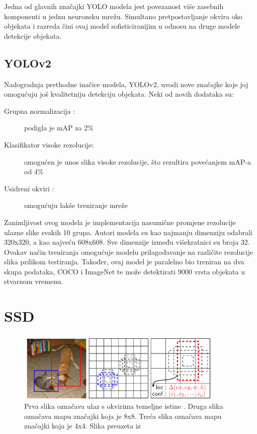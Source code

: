 Jedna od glavnih značajki YOLO modela jest povezanost više zasebnih komponenti u jednu neuronsku mrežu. 
Simultano pretpostavljanje okvira oko objekata i razreda čini ovaj model sofisticiranijim u odnosu na druge modele detekcije objekata. 


\subsection{YOLOv2}
Nadogradnja prethodne inačice modela, YOLOv2, uvodi nove značajke koje joj omogućuju još kvalitetniju detekciju objekata.\newline
Neki od novih dodataka su:
\begin{description}
    \item [Grupna normalizacija :]podigla je mAP za 2\%
    \item [Klasifikator visoke rezolucije:]omogućen je unos slika visoke rezolucije, što rezultira povećanjem mAP-a od 4\%
    \item [Usidreni okviri :]omogućuju lakše treniranje mreže
\end{description}

Zanimljivost ovog modela je implementacija nasumične promjene rezolucije ulazne slike svakih 10 grupa.
Autori modela su kao najmanju dimenziju odabrali 320x320, a 
kao najveću 608x608. Sve dimenzije između višekratnici su broja 32. \newline
Ovakav način treniranja omogućuje modelu prilagođavanje na različite rezolucije 
slika prilikom testiranja. \newline
Također, ovaj model je paralelno bio treniran na dva skupa podataka, COCO i ImageNet te može 
detektirati 9000 vrsta objekata u stvarnom vremenu. \citep{DBLP:journals/corr/RedmonF16}


\section{SSD}


\begin{figure}[h!]
    \centering
    \includegraphics[width=10cm]{img/SSD.png}
    \caption{Prva slika označava ulaz s okvirima temeljne istine . Druga slika označava mapu značajki koja je 8x8. Treća slika označava mapu značajki koja je 4x4. Slika preuzeta iz \citep{DBLP:journals/corr/LiuAESR15}}
    \label{SSD model}
\end{figure}

